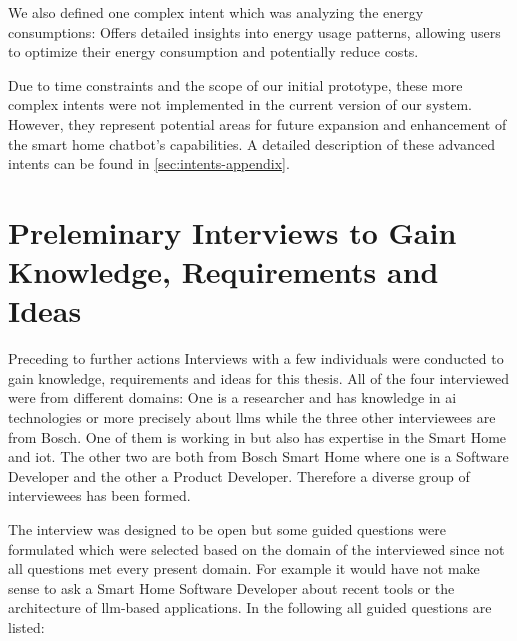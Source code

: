 We also defined one complex intent which was analyzing the energy consumptions: Offers detailed insights into energy usage patterns, allowing users to optimize their energy consumption and potentially reduce costs.

Due to time constraints and the scope of our initial prototype, these more complex intents were not implemented in the current version of our system. 
However, they represent potential areas for future expansion and enhancement of the smart home chatbot's capabilities. A detailed description of these advanced intents can be found in \cref{sec:intents-appendix}.

\section{Preleminary Interviews to Gain Knowledge, Requirements and Ideas}
Preceding to further actions Interviews with a few individuals were conducted to gain knowledge, requirements and ideas for this thesis.
All of the four interviewed were from different domains: One is a researcher and has knowledge in \gls{ai} technologies or more precisely about \glspl{llm} while the three other interviewees are from Bosch.
One of them is working in  but also has expertise in the Smart Home and \gls{iot}. 
The other two are both from Bosch Smart Home where one is a Software Developer and the other a Product Developer.
Therefore a diverse group of interviewees has been formed.

The interview was designed to be open but some guided questions were formulated which were selected based on the domain of the interviewed since not all questions met every present domain.
For example it would have not make sense to ask a Smart Home Software Developer about recent tools or the architecture of \gls{llm}-based applications.
In the following all guided questions are listed:

